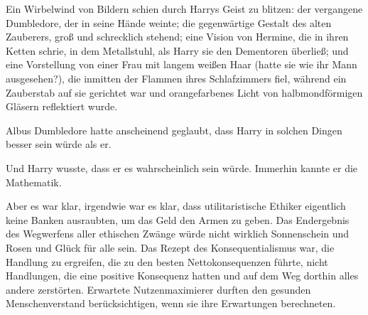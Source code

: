 Ein Wirbelwind von Bildern schien durch Harrys Geist zu blitzen: der vergangene Dumbledore, der in seine Hände weinte; die gegenwärtige Gestalt des alten Zauberers, groß und schrecklich stehend; eine Vision von Hermine, die in ihren Ketten schrie, in dem Metallstuhl, als Harry sie den Dementoren überließ; und eine Vorstellung von einer Frau mit langem weißen Haar (hatte sie wie ihr Mann ausgesehen?), die inmitten der Flammen ihres Schlafzimmers fiel, während ein Zauberstab auf sie gerichtet war und orangefarbenes Licht von halbmondförmigen Gläsern reflektiert wurde.

Albus Dumbledore hatte anscheinend geglaubt, dass Harry in solchen Dingen besser sein würde als er.

Und Harry wusste, dass er es wahrscheinlich sein würde.
Immerhin kannte er die Mathematik.

Aber es war klar, irgendwie war es klar, dass utilitaristische Ethiker eigentlich keine Banken ausraubten, um das Geld den Armen zu geben. Das Endergebnis des Wegwerfens aller ethischen Zwänge würde nicht wirklich Sonnenschein und Rosen und Glück für alle sein. Das Rezept des Konsequentialismus war, die Handlung zu ergreifen, die zu den besten Nettokonsequenzen führte, nicht Handlungen, die eine positive Konsequenz hatten und auf dem Weg dorthin alles andere zerstörten.
Erwartete Nutzenmaximierer durften den gesunden Menschenverstand berücksichtigen, wenn sie ihre Erwartungen berechneten.

